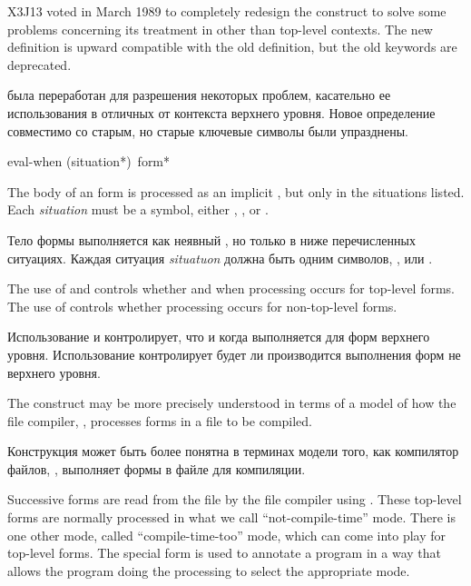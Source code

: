 \begin{newer}
X3J13 voted in March 1989  to
completely redesign the  construct to solve some problems
concerning its treatment in other than top-level contexts.
The new definition is upward compatible with the old definition,
but the old keywords are deprecated.

 была переработан для разрешения некоторых проблем, касательно ее
использования в отличных от контекста верхнего уровня. Новое определение
совместимо со старым, но старые ключевые символы были упразднены.

\begin{defspec}
eval-when ({situation}*) {\,form}*

  The body of an  form is processed as an implicit , but
  only in the situations listed.  Each \textit{situation} must be a symbol,
  either ,
  , or .


  Тело формы  выполняется как неявный , но только в
  ниже перечисленных ситуациях. Каждая ситуация \textit{situatuon} должна быть
  одним символов, ,  или .

  The use of  and 
  controls whether and when processing
  occurs for top-level forms. The use of  controls whether
  processing occurs for non-top-level forms.


  Использование  и  контролирует, что и
  когда выполняется для форм верхнего уровня. Использование 
  контролирует будет ли производится выполнения форм не верхнего уровня.


  The  construct may be more precisely understood in terms of
  a model of how the file compiler, , processes forms in a
  file to be compiled.


  Конструкция  может быть более понятна в терминах модели того,
  как компилятор файлов, , выполняет формы в файле для
  компиляции.


  Successive forms are read from the file by the file compiler using 
  . These top-level forms are normally processed in what we call
  ``not-compile-time'' mode. There is one other mode, called 
  ``compile-time-too'' mode, which can come into play for top-level
  forms. The  special form is used to annotate a program
  in a way that allows the program doing the processing to select
  the appropriate mode.



\end{defspec}
\end{newer}
